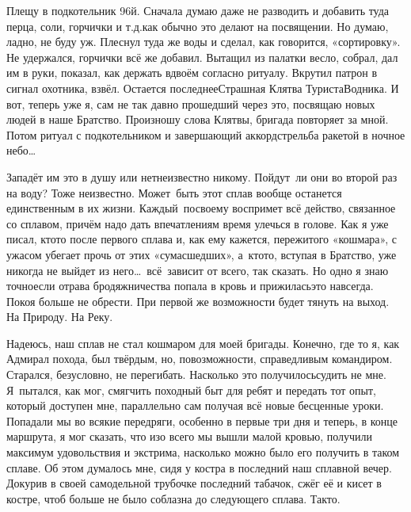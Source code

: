 Плещу в подкотельник 96\sdash й. Сначала думаю даже не разводить и добавить туда перца, соли, горчички и т.д.\mdash как обычно это делают на посвящении. Но думаю, ладно, не буду уж. Плеснул туда же воды и сделал, как говорится, «сортировку». Не удержался, горчички всё же добавил. Вытащил из палатки весло, собрал, дал им в руки, показал, как держать вдвоём согласно ритуалу. Вкрутил патрон в сигнал охотника, взвёл. Остается последнее\mdash Страшная Клятва Туриста\sdash Водника. И вот, теперь уже я, сам не так давно прошедший через это, посвящаю новых людей в наше Братство. Произношу слова Клятвы, бригада повторяет за мной. Потом ритуал с подкотельником и завершающий аккорд\mdash стрельба ракетой в ночное небо\ldots~   

Западёт им это в душу или нет\mdash неизвестно никому. Пойдут~ли они во второй раз на воду? Тоже неизвестно. Может~быть этот сплав вообще останется единственным в их жизни. Каждый~по\sdash своему воспримет всё действо, связанное со сплавом, причём надо дать впечатлениям время улечься в голове. Как я уже писал, кто\sdash то после первого сплава и, как ему кажется, пережитого «кошмара», с ужасом убегает прочь от этих «сумасшедших», а~кто\sdash то, вступая в Братство, уже никогда не выйдет из него\ldots~всё~зависит от всего, так сказать. Но одно я знаю точно\mdash если отрава бродяжничества попала в кровь и прижилась\mdash это навсегда. Покоя больше не обрести. При первой же возможности будет тянуть на выход. На Природу. На Реку.

Надеюсь, наш сплав не стал кошмаром для моей бригады. Конечно, где то я, как Адмирал похода, был твёрдым, но, по\sdash возможности, справедливым командиром. Старался, безусловно, не перегибать. Насколько это получилось\mdash судить не мне. Я~пытался, как мог, смягчить походный быт для ребят и передать тот опыт, который доступен мне, параллельно сам получая всё новые бесценные уроки. Попадали мы во всякие передряги, особенно в первые три дня и теперь, в конце маршрута, я мог сказать, что изо всего мы вышли малой кровью, получили максимум удовольствия и экстрима, насколько можно было его получить в таком сплаве. Об этом думалось мне, сидя у костра в последний наш сплавной вечер. Докурив в своей самодельной трубочке последний табачок, сжёг её и кисет в костре, чтоб больше не было соблазна до следующего сплава. Так\sdash то. 

\begin{center}
\end{center}